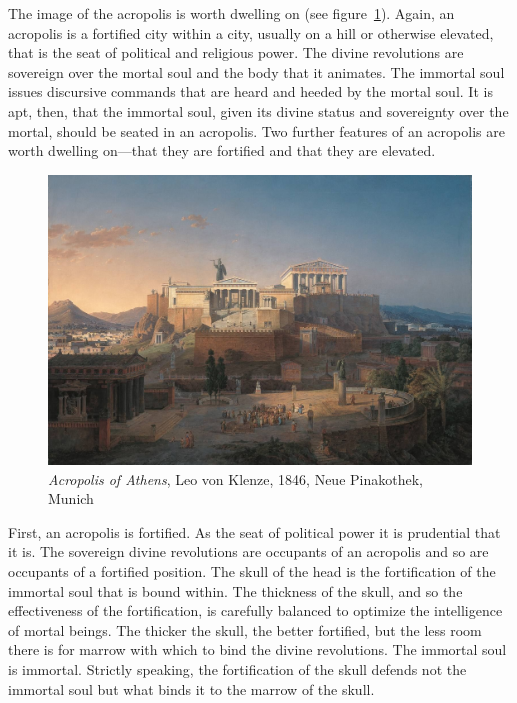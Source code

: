The image of the acropolis is worth dwelling on (see figure~\ref{acropolis}). Again, an acropolis is a fortified city within a city, usually on a hill or otherwise elevated, that is the seat of political and religious power. The divine revolutions are sovereign over the mortal soul and the body that it animates. The immortal soul issues discursive commands that are heard and heeded by the mortal soul. It is apt, then, that the immortal soul, given its divine status and sovereignty over the mortal, should be seated in an acropolis. Two further features of an acropolis are worth dwelling on---that they are fortified and that they are elevated.

\begin{figure}[htbp]
     \centering
         \includegraphics[scale=0.20]{graphics/Akropolis_by_Leo_von_Klenze.jpg}
     \caption{\emph{Acropolis of Athens}, Leo von Klenze, 1846, Neue Pinakothek, Munich}
     \label{acropolis}
\end{figure}

First, an acropolis is fortified. As the seat of political power it is prudential that it is. The sovereign divine revolutions are occupants of an acropolis and so are occupants of a fortified position. The skull of the head is the fortification of the immortal soul that is bound within. The thickness of the skull, and so the effectiveness of the fortification, is carefully balanced to optimize the intelligence of mortal beings. The thicker the skull, the better fortified, but the less room there is for marrow with which to bind the divine revolutions. The immortal soul is immortal. Strictly speaking, the fortification of the skull defends not the immortal soul but what binds it to the marrow of the skull. 

